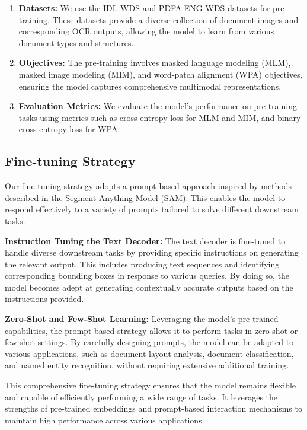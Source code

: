\documentclass{article}
\begin{document}
\begin{enumerate}
    \item \textbf{Datasets:} We use the IDL-WDS and PDFA-ENG-WDS datasets for pre-training. These datasets provide a diverse collection of document images and corresponding OCR outputs, allowing the model to learn from various document types and structures.
    \item \textbf{Objectives:} The pre-training involves masked language modeling (MLM), masked image modeling (MIM), and word-patch alignment (WPA) objectives, ensuring the model captures comprehensive multimodal representations.
    \item \textbf{Evaluation Metrics:} We evaluate the model's performance on pre-training tasks using metrics such as cross-entropy loss for MLM and MIM, and binary cross-entropy loss for WPA.
\end{enumerate}

\subsection{Fine-tuning Strategy}

Our fine-tuning strategy adopts a prompt-based approach inspired by methods described in the Segment Anything Model (SAM). This enables the model to respond effectively to a variety of prompts tailored to solve different downstream tasks.

\textbf{Instruction Tuning the Text Decoder:} The text decoder is fine-tuned to handle diverse downstream tasks by providing specific instructions on generating the relevant output. This includes producing text sequences and identifying corresponding bounding boxes in response to various queries. By doing so, the model becomes adept at generating contextually accurate outputs based on the instructions provided.

\textbf{Zero-Shot and Few-Shot Learning:} Leveraging the model’s pre-trained capabilities, the prompt-based strategy allows it to perform tasks in zero-shot or few-shot settings. By carefully designing prompts, the model can be adapted to various applications, such as document layout analysis, document classification, and named entity recognition, without requiring extensive additional training.

This comprehensive fine-tuning strategy ensures that the model remains flexible and capable of efficiently performing a wide range of tasks. It leverages the strengths of pre-trained embeddings and prompt-based interaction mechanisms to maintain high performance across various applications.
\end{document}
